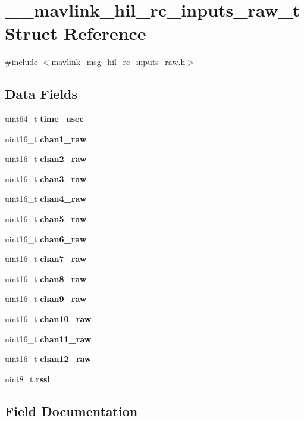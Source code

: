 \section{\+\_\+\+\_\+mavlink\+\_\+hil\+\_\+rc\+\_\+inputs\+\_\+raw\+\_\+t Struct Reference}
\label{struct____mavlink__hil__rc__inputs__raw__t}


{\ttfamily \#include $<$mavlink\+\_\+msg\+\_\+hil\+\_\+rc\+\_\+inputs\+\_\+raw.\+h$>$}

\subsection*{Data Fields}
\begin{DoxyCompactItemize}
\item 
uint64\+\_\+t \textbf{ time\+\_\+usec}
\item 
uint16\+\_\+t \textbf{ chan1\+\_\+raw}
\item 
uint16\+\_\+t \textbf{ chan2\+\_\+raw}
\item 
uint16\+\_\+t \textbf{ chan3\+\_\+raw}
\item 
uint16\+\_\+t \textbf{ chan4\+\_\+raw}
\item 
uint16\+\_\+t \textbf{ chan5\+\_\+raw}
\item 
uint16\+\_\+t \textbf{ chan6\+\_\+raw}
\item 
uint16\+\_\+t \textbf{ chan7\+\_\+raw}
\item 
uint16\+\_\+t \textbf{ chan8\+\_\+raw}
\item 
uint16\+\_\+t \textbf{ chan9\+\_\+raw}
\item 
uint16\+\_\+t \textbf{ chan10\+\_\+raw}
\item 
uint16\+\_\+t \textbf{ chan11\+\_\+raw}
\item 
uint16\+\_\+t \textbf{ chan12\+\_\+raw}
\item 
uint8\+\_\+t \textbf{ rssi}
\end{DoxyCompactItemize}


\subsection{Field Documentation}
\mbox{\label{struct____mavlink__hil__rc__inputs__raw__t_ad2c997eae3fc6ac943f7bb79b8276643}} 
